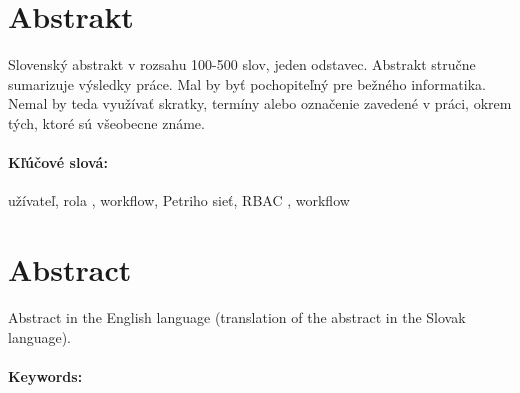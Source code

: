 \documentclass[12pt, oneside]{book}
\begin{document}
\noindent  

\vfill



\newpage 
\section*{Abstrakt}


Slovenský abstrakt v rozsahu 100-500 slov, jeden odstavec. Abstrakt
stručne sumarizuje výsledky práce. Mal by byť pochopiteľný pre bežného
informatika. Nemal by teda využívať skratky, termíny alebo označenie
zavedené v práci, okrem tých, ktoré sú všeobecne známe.

\paragraph*{Kľúčové slová:} užívateľ, rola , workflow, Petriho sieť, RBAC , workflow


\newpage 
\section*{Abstract}

Abstract in the English language (translation of the abstract in the
Slovak language).


\paragraph*{Keywords:} 


%
%



\newpage 


\tableofcontents
\end{document}
